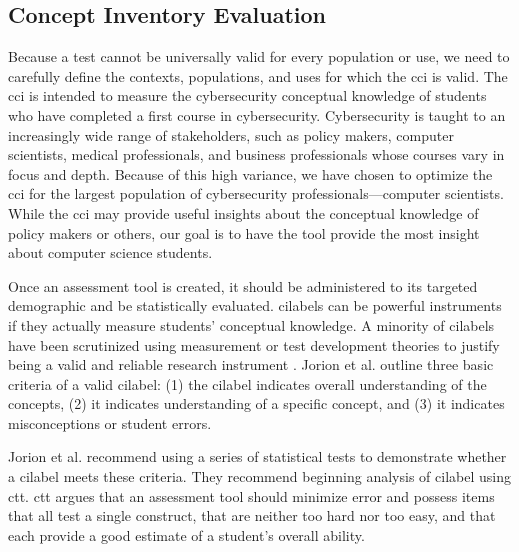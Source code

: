 \subsection{Concept Inventory Evaluation}

Because a test cannot be universally valid for every population or use, we need to carefully define the contexts, populations, and uses for which the \gls{cci} is valid. The \gls{cci} is intended to measure the cybersecurity conceptual knowledge of students who have completed a first course in cybersecurity. Cybersecurity is taught to an increasingly wide range of stakeholders, such as policy makers, computer scientists, medical professionals, and business professionals whose courses vary in focus and depth. Because of this high variance, we have chosen to optimize the \gls{cci} for the largest population of cybersecurity professionals---computer scientists. While the \gls{cci} may provide useful insights about the conceptual knowledge of policy makers or others, our goal is to have the tool provide the most insight about computer science students. 

Once an assessment tool is created, it should be administered to its targeted demographic and be statistically evaluated. \glspl{cilabel} can be powerful instruments if they actually measure students' conceptual knowledge. A minority of \glspl{cilabel} have been scrutinized using measurement or test development theories to justify being a valid and reliable research instrument \cite{dlci}. Jorion et al. \cite{jorian} outline three basic criteria of a valid \gls{cilabel}: (1) the \gls{cilabel} indicates overall understanding of the concepts, (2) it indicates understanding of a specific concept, and (3) it indicates misconceptions or student errors.

 Jorion et al. recommend using a series of statistical tests to demonstrate whether a \gls{cilabel} meets these criteria. They recommend beginning analysis of \gls{cilabel} using \gls{ctt}. \gls{ctt} argues that an assessment tool should minimize error and possess items that all test a single construct, that are neither too hard nor too easy, and that each provide a good estimate of a student's overall ability. 